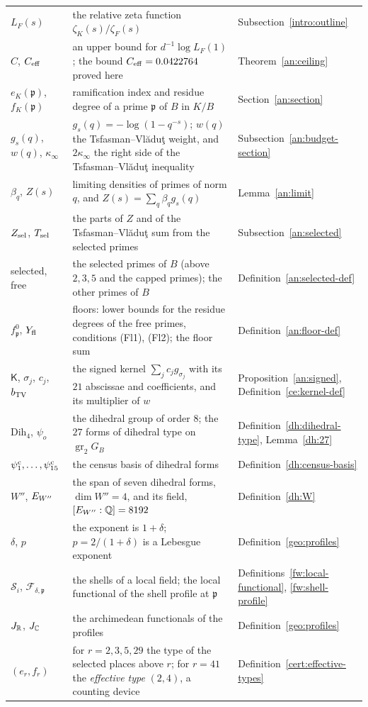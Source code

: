 {\begin{longtable}{@{}>{\raggedright\arraybackslash}p{}>{\raggedright\arraybackslash}p{}>{\raggedright\arraybackslash}p{}@{}}
$L_F(s)$ & the relative zeta function $\zeta_K(s)/\zeta_F(s)$ & Subsection~\ref{intro:outline}\\
$C$, $C_{\rm eff}$ & an upper bound for $d^{-1}\log L_F(1)$; the bound $C_{\rm eff}=0.0422764$ proved here & Theorem~\ref{an:ceiling}\\
$e_K(\mathfrak p)$, $f_K(\mathfrak p)$ & ramification index and residue degree of a prime $\mathfrak p$ of $B$ in $K/B$ & Section~\ref{an:section}\\
$g_s(q)$, $w(q)$, $\kappa_\infty$ & $g_s(q)=-\log(1-q^{-s})$; $w(q)$ the Tsfasman--Vl\u{a}du\c{t} weight, and $2\kappa_\infty$ the right side of the Tsfasman--Vl\u{a}du\c{t} inequality & Subsection~\ref{an:budget-section}\\
$\beta_q$, $Z(s)$ & limiting densities of primes of norm $q$, and $Z(s)=\sum_q\beta_qg_s(q)$ & Lemma~\ref{an:limit}\\
$Z_{\rm sel}$, $T_{\rm sel}$ & the parts of $Z$ and of the Tsfasman--Vl\u{a}du\c{t} sum from the selected primes & Subsection~\ref{an:selected}\\
selected, free & the selected primes of $B$ (above $2,3,5$ and the capped primes); the other primes of $B$ & Definition~\ref{an:selected-def}\\
$f^0_{\mathfrak p}$, $Y_{\rm fl}$ & floors: lower bounds for the residue degrees of the free primes, conditions (Fl1), (Fl2); the floor sum & Definition~\ref{an:floor-def}\\
$\mathsf K$, $\sigma_j$, $c_j$, $b_{\rm TV}$ & the signed kernel $\sum_jc_jg_{\sigma_j}$ with its $21$ abscissae and coefficients, and its multiplier of $w$ & Proposition~\ref{an:signed}, Definition~\ref{ce:kernel-def}\\
$\mathrm{Dih}_4$, $\psi_o$ & the dihedral group of order $8$; the $27$ forms of dihedral type on $\operatorname{gr}_2G_B$ & Definition~\ref{dh:dihedral-type}, Lemma~\ref{dh:27}\\
$\psi^{\rm c}_1,\dots,\psi^{\rm c}_{15}$ & the census basis of dihedral forms & Definition~\ref{dh:census-basis}\\
$W''$, $E_{W''}$ & the span of seven dihedral forms, $\dim W''=4$, and its field, $[E_{W''}:\mathbb Q]=8192$ & Definition~\ref{dh:W}\\
$\delta$, $p$ & the exponent is $1+\delta$; $p=2/(1+\delta)$ is a Lebesgue exponent & Definition~\ref{geo:profiles}\\
$\mathcal S_i$, $\mathcal F_{\delta,\mathfrak p}$ & the shells of a local field; the local functional of the shell profile at $\mathfrak p$ & Definitions~\ref{fw:local-functional}, \ref{fw:shell-profile}\\
$J_\mathbb R$, $J_\mathbb C$ & the archimedean functionals of the profiles & Definition~\ref{geo:profiles}\\
$(e_r,f_r)$ & for $r=2,3,5,29$ the type of the selected places above $r$; for $r=41$ the
 \emph{effective type} $(2,4)$, a counting device & Definition~\ref{cert:effective-types}\\
\bottomrule
\end{longtable}}

